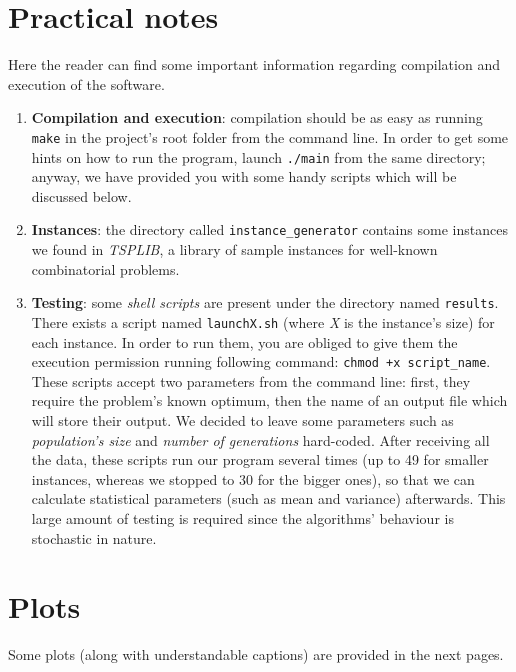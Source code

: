 \documentclass[letterpaper, 10 pt, conference]{ieeeconf}  %
\begin{document}
\section*{Practical notes}
Here the reader can find some important information regarding 
compilation and execution of the software.
\begin{enumerate} 
\item \textbf{Compilation and execution}: compilation should be as easy as running \texttt{make} in the project's root folder from the command line.\newline 
In order to get some hints on how to run the program, launch \texttt{./main} from the same directory; anyway, we have provided you with some handy scripts which will be discussed below.
\item \textbf{Instances}: the directory called \texttt{instance\_generator} contains some instances we found in \textit{TSPLIB}, a library of sample instances for well-known combinatorial problems.
\item \textbf{Testing}: some \textit{shell scripts} are present under the directory named \texttt{results}. There exists a script named \texttt{launchX.sh} (where \textit{X} is the instance's size) for each instance. In order to run them, you are obliged to give them the execution permission running following command: \texttt{chmod +x script\_name}. \newline
These scripts accept two parameters from the command line: first, they require the problem's known optimum, then the name of an output file which will store their output. \newline We decided to leave some parameters such as \textit{population's size} and \textit{number of generations} hard-coded. \newline
After receiving all the data, these scripts run our program  several times (up to 49 for smaller instances, whereas we stopped to 30 for the bigger ones), so that we can calculate statistical parameters (such as mean and variance) afterwards.
This large amount of testing is required since the algorithms' behaviour is stochastic in nature.
\end{enumerate}

\section*{Plots}
Some plots (along with understandable captions) are provided in the next pages.
\clearpage
\end{document}
